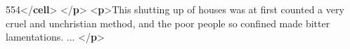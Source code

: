 \documentclass[11pt,twoside]{article}\makeatletter
\begin{document}
\begin{shaded}
\hspace*{6pt}\hspace*{6pt}554{</\textbf{cell}>}\mbox{}\newline 
\hspace*{6pt}\mbox{}\newline 
{}\mbox{}\newline 
{</\textbf{p}>}\mbox{}\newline 
{<\textbf{p}>}This shutting up of houses was at first counted a very cruel\mbox{}\newline 
 and unchristian method, and the poor people so confined made\mbox{}\newline 
 bitter lamentations. ... {</\textbf{p}>}\end{shaded}\egroup\par 
\end{document}
